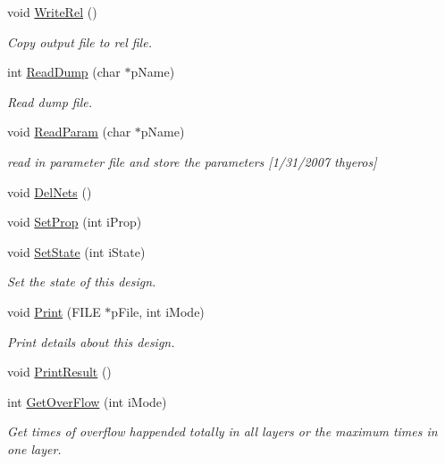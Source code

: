 \begin{DoxyCompactItemize}
void \mbox{\hyperlink{classCDesign_a69b246b26e9ce4c4edbf74065529b89f}{Write\+Rel}} ()
\begin{DoxyCompactList}\small\item\em Copy output file to rel file. \end{DoxyCompactList}\item 
int \mbox{\hyperlink{classCDesign_add678d74b22a8bd58dec921656454bdd}{Read\+Dump}} (char $\ast$p\+Name)
\begin{DoxyCompactList}\small\item\em Read dump file. \end{DoxyCompactList}\item 
void \mbox{\hyperlink{classCDesign_a91266987b4edb768fb3187e92a9cfbbd}{Read\+Param}} (char $\ast$p\+Name)
\begin{DoxyCompactList}\small\item\em read in parameter file and store the parameters \mbox{[}1/31/2007 thyeros\mbox{]} \end{DoxyCompactList}\item 
void \mbox{\hyperlink{classCDesign_a02442687ac58142d9e5b0a5886ee8285}{Del\+Nets}} ()
\item 
void \mbox{\hyperlink{classCDesign_afc3a5c7e4453c76a44eec25c38c72135}{Set\+Prop}} (int i\+Prop)
\item 
void \mbox{\hyperlink{classCDesign_adda7bcca7062f58a27baa043bd315bfd}{Set\+State}} (int i\+State)
\begin{DoxyCompactList}\small\item\em Set the state of this design. \end{DoxyCompactList}\item 
void \mbox{\hyperlink{classCDesign_ae6f1b5262fb9420660bd768cb7ae613e}{Print}} (F\+I\+LE $\ast$p\+File, int i\+Mode)
\begin{DoxyCompactList}\small\item\em Print details about this design. \end{DoxyCompactList}\item 
void \mbox{\hyperlink{classCDesign_af1fc7df15f389d8051d74c7867d3d6be}{Print\+Result}} ()
\item 
int \mbox{\hyperlink{classCDesign_affc3b0b72b0991118a2141e11cbdab6e}{Get\+Over\+Flow}} (int i\+Mode)
\begin{DoxyCompactList}\small\item\em Get times of overflow happended totally in all layers or the maximum times in one layer. \end{DoxyCompactList}\item 

\end{DoxyCompactItemize}
